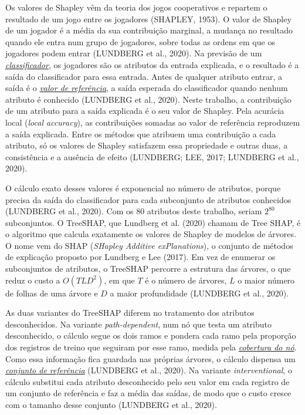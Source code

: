 \documentclass[
  12pt,
  oneside,
  a4paper,
  chapter=TITLE,
  sumario=tradicional,
  english,
  brazil
]{abntex2}
\newcommand{\termo}[2]{\hyperref[gl:#1]{\emph{#2}}}
\begin{document}
Os valores de Shapley vêm da teoria dos jogos cooperativos e repartem o resultado de um jogo entre
os jogadores (SHAPLEY, 1953). O valor de Shapley de um jogador é a média da sua contribuição
marginal, a mudança no resultado quando ele entra num grupo de jogadores, sobre todas as ordens em
que os jogadores podem entrar (LUNDBERG et al., 2020). Na previsão de um
\termo{classificador}{classificador}, os jogadores são os atributos da entrada explicada, e o
resultado é a saída do classificador para essa entrada. Antes de qualquer atributo entrar, a saída é
o \termo{valor-referencia}{valor de referência}, a saída esperada do classificador quando nenhum
atributo é conhecido (LUNDBERG et al., 2020). Neste trabalho, a contribuição de um atributo para a
saída explicada é o seu valor de Shapley. Pela acurácia local (\emph{local accuracy}), as
contribuições somadas ao valor de referência reproduzem a saída explicada. Entre os métodos que
atribuem uma contribuição a cada atributo, só os valores de Shapley satisfazem essa propriedade e
outras duas, a consistência e a ausência de efeito (LUNDBERG; LEE, 2017; LUNDBERG et al., 2020).

O cálculo exato desses valores é exponencial no número de atributos, porque precisa da saída do
classificador para cada subconjunto de atributos conhecidos (LUNDBERG et al., 2020). Com os 80
atributos deste trabalho, seriam $2^{80}$ subconjuntos. O TreeSHAP, que Lundberg et al. (2020)
chamam de Tree SHAP, é o algoritmo que calcula exatamente os valores de Shapley de modelos de
árvores. O nome vem do SHAP (\emph{SHapley Additive exPlanations}), o conjunto de métodos de
explicação proposto por Lundberg e Lee (2017). Em vez de enumerar os subconjuntos de atributos, o
TreeSHAP percorre a estrutura das árvores, o que reduz o custo a $O(TLD^2)$, em que $T$ é o número
de árvores, $L$ o maior número de folhas de uma árvore e $D$ a maior profundidade (LUNDBERG et al.,
2020).

As duas variantes do TreeSHAP diferem no tratamento dos atributos desconhecidos. Na variante
\emph{path-dependent}, num nó que testa um atributo desconhecido, o cálculo segue os dois ramos e
pondera cada ramo pela proporção dos registros de treino que seguiram por esse ramo, medida pela
\termo{cobertura-no}{cobertura do nó}. Como essa informação fica guardada nas próprias árvores,
o cálculo dispensa um \termo{conjunto-referencia}{conjunto de referência} (LUNDBERG et al., 2020). Na
variante \emph{interventional}, o cálculo substitui cada atributo desconhecido pelo seu valor em
cada registro de um conjunto de referência e faz a média das saídas, de modo que o custo cresce com
o tamanho desse conjunto (LUNDBERG et al., 2020).
\end{document}
